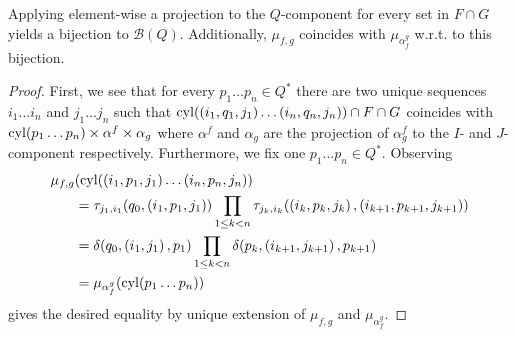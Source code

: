 \begin{lemma}
  Applying element-wise a projection to the $Q$-component for every set in 
  $F\cap G$ yields a bijection to $\mathcal{B}(Q)$. Additionally, $\mu_{f,g}$ 
  coincides with $\mu_{\alpha_{f}^{g}}$ w.r.t. to this bijection.
  \label{lem:fginpba}
\end{lemma}
\begin{proof}
  First, we see that for every $p_{1}\dots p_{n}\in Q^{*}$ there are two 
  unique sequences $i_{1}\dots i_{n}$ and $j_{1}\dots j_{n}$ such that
  $\operatorname{cyl}(\left(i_{1}, q_{1}, j_{1}\right)\dots\left(i_{n}, q_{n}, j_{n}\right))\cap 
  F\cap G$ coincides with 
  $\operatorname{cyl}(p_{1}\dots p_{n})\times \alpha^{f}\times\alpha_{g}$ where 
  $\alpha^{f}$ and $\alpha_{g}$ are the projection of $\alpha^{f}_{g}$ to the
  $I$- and $J$-component respectively. Furthermore, we fix one 
  $p_{1}\dots p_{n}\in Q^{*}$. Observing
  \begin{align*}
    \mu_{f, g}&(
      \operatorname{cyl}(\left(i_{1}, p_{1}, j_{1}\right)\dots\left(i_{n}, p_{n}, j_{n}\right))\\
    &= \tau_{j_{1}, i_{1}}(q_{0}, \left(i_{1}, p_{1}, j_{1}\right))
      \prod\limits_{1\leq k < n}\tau_{j_{k}, i_{k}}(\left(i_{k}, p_{k}, 
        j_{k}\right),\left(i_{k+1}, p_{k+1}, j_{k+1}\right))\\
    &= \delta(q_{0}, \left(i_{1}, j_{1}\right), p_{1})
      \prod\limits_{1\leq k < n}\delta(p_{k}, \left(i_{k+1}, j_{k+1}\right), 
        p_{k+1})\\
    &= \mu_{\alpha_{f}^{g}}(\operatorname{cyl}(p_{1}\dots p_{n}))
  \end{align*}
  gives the desired equality by unique extension of $\mu_{f, g}$ and 
  $\mu_{\alpha_{f}^{g}}$.
\end{proof}

